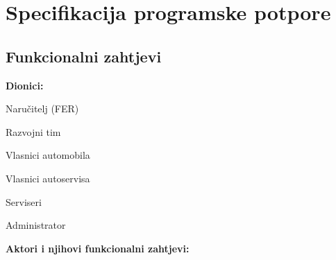 \chapter{Specifikacija programske potpore}
		
	\section{Funkcionalni zahtjevi}

			\noindent \textbf{Dionici:}

			\begin{packed_enum}

                \item Naručitelj (FER)
				\item Razvojni tim
				\item Vlasnici automobila
				\item Vlasnici autoservisa
				\item Serviseri
				\item Administrator

			\end{packed_enum}

			\noindent \textbf{Aktori i njihovi funkcionalni zahtjevi:}


